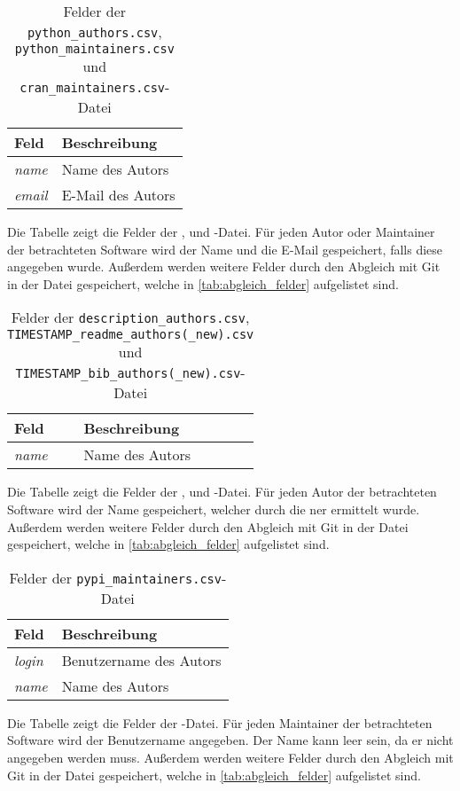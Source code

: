 \begin{table}
    \begin{tabularx}{\textwidth}{XL{10.2cm}}
        \toprule
        \textbf{Feld} & \textbf{Beschreibung} \\ \midrule
        \emph{name}   & Name des Autors       \\
        \emph{email}  & E-Mail des Autors     \\
        \bottomrule
    \end{tabularx}
    \caption{Felder der \texttt{python\_authors.csv}, \texttt{python\_maintainers.csv} und \texttt{cran\_maintainers.csv}-Datei}
    \label{tab:python_authors}
    \small
    Die Tabelle zeigt die Felder der ,  und -Datei. Für jeden Autor oder Maintainer der betrachteten Software wird der Name und die E-Mail gespeichert, falls diese angegeben wurde. Außerdem werden weitere Felder durch den Abgleich mit Git in der Datei gespeichert, welche in \autoref{tab:abgleich_felder} aufgelistet sind.
\end{table}

\begin{table}
    \begin{tabularx}{\textwidth}{XL{10.2cm}}
        \toprule
        \textbf{Feld} & \textbf{Beschreibung} \\ \midrule
        \emph{name}   & Name des Autors       \\
        \bottomrule
    \end{tabularx}
    \caption{Felder der \texttt{description\_authors.csv}, \texttt{TIMESTAMP\_readme\_authors(\_new).csv} und \texttt{TIMESTAMP\_bib\_authors(\_new).csv}-Datei}
    \label{tab:description_authors}
    \small
    Die Tabelle zeigt die Felder der ,  und -Datei. Für jeden Autor der betrachteten Software wird der Name gespeichert, welcher durch die \gls{ner} ermittelt wurde. Außerdem werden weitere Felder durch den Abgleich mit Git in der Datei gespeichert, welche in \autoref{tab:abgleich_felder} aufgelistet sind.
\end{table}

\begin{table}
    \begin{tabularx}{\textwidth}{XL{10.2cm}}
        \toprule
        \textbf{Feld} & \textbf{Beschreibung}   \\ \midrule
        \emph{login}  & Benutzername des Autors \\
        \emph{name}   & Name des Autors         \\
        \bottomrule
    \end{tabularx}
    \caption{Felder der \texttt{pypi\_maintainers.csv}-Datei}
    \label{tab:pypi_maintainers}
    \small
    Die Tabelle zeigt die Felder der -Datei. Für jeden Maintainer der betrachteten Software wird der Benutzername angegeben. Der Name kann leer sein, da er nicht angegeben werden muss. Außerdem werden weitere Felder durch den Abgleich mit Git in der Datei gespeichert, welche in \autoref{tab:abgleich_felder} aufgelistet sind.
\end{table}
